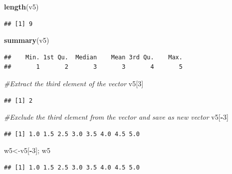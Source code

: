 \documentclass[
]{book}
\newenvironment{Shaded}{\begin{snugshade}}{\end{snugshade}}
\newcommand{\CommentTok}[1]{\textcolor[rgb]{0.56,0.35,0.01}{\textit{#1}}}
\newcommand{\DecValTok}[1]{\textcolor[rgb]{0.00,0.00,0.81}{#1}}
\newcommand{\FunctionTok}[1]{\textcolor[rgb]{0.13,0.29,0.53}{\textbf{#1}}}
\newcommand{\NormalTok}[1]{#1}
\newcommand{\OtherTok}[1]{\textcolor[rgb]{0.56,0.35,0.01}{#1}}
\newcommand{\SpecialCharTok}[1]{\textcolor[rgb]{0.81,0.36,0.00}{\textbf{#1}}}
\begin{document}
\begin{Shaded}
\begin{Highlighting}[]
\FunctionTok{length}\NormalTok{(v5)}
\end{Highlighting}
\end{Shaded}

\begin{verbatim}
## [1] 9
\end{verbatim}

\begin{Shaded}
\begin{Highlighting}[]
\FunctionTok{summary}\NormalTok{(v5)}
\end{Highlighting}
\end{Shaded}

\begin{verbatim}
##    Min. 1st Qu.  Median    Mean 3rd Qu.    Max. 
##       1       2       3       3       4       5
\end{verbatim}

\begin{Shaded}
\begin{Highlighting}[]
\CommentTok{\#Extract the third element of the vector}
\NormalTok{v5[}\DecValTok{3}\NormalTok{]}
\end{Highlighting}
\end{Shaded}

\begin{verbatim}
## [1] 2
\end{verbatim}

\begin{Shaded}
\begin{Highlighting}[]
\CommentTok{\#Exclude the third element from the vector and save as new vector}
\NormalTok{v5[}\SpecialCharTok{{-}}\DecValTok{3}\NormalTok{]}
\end{Highlighting}
\end{Shaded}

\begin{verbatim}
## [1] 1.0 1.5 2.5 3.0 3.5 4.0 4.5 5.0
\end{verbatim}

\begin{Shaded}
\begin{Highlighting}[]
\NormalTok{w5}\OtherTok{\textless{}{-}}\NormalTok{v5[}\SpecialCharTok{{-}}\DecValTok{3}\NormalTok{]; w5}
\end{Highlighting}
\end{Shaded}

\begin{verbatim}
## [1] 1.0 1.5 2.5 3.0 3.5 4.0 4.5 5.0
\end{verbatim}
\end{document}
